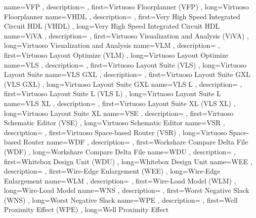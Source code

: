 { name={VFP}
, description={}
, first={Virtuoso Floorplanner (VFP)}
, long={Virtuoso Floorplanner}
}
{ name={VHDL}
, description={}
, first={Very High Speed Integrated Circuit HDL (VHDL)}
, long={Very High Speed Integrated Circuit HDL}
}
{ name={ViVA}
, description={}
, first={Virtuoso Visualization and Analysis (ViVA)}
, long={Virtuoso Visualization and Analysis}
}
{ name={VLM}
, description={}
, first={Virtuoso Layout Optimize (VLM)}
, long={Virtuoso Layout Optimize}
}
{ name={VLS}
, description={}
, first={Virtuoso Layout Suite (VLS)}
, long={Virtuoso Layout Suite}
}
{ name={VLS GXL}
, description={}
, first={Virtuoso Layout Suite GXL (VLS GXL)}
, long={Virtuoso Layout Suite GXL}
}
{ name={VLS L}
, description={}
, first={Virtuoso Layout Suite L (VLS L)}
, long={Virtuoso Layout Suite L}
}
{ name={VLS XL}
, description={}
, first={Virtuoso Layout Suite XL (VLS XL)}
, long={Virtuoso Layout Suite XL}
}
{ name={VSE}
, description={}
, first={Virtuoso Schematic Editor (VSE)}
, long={Virtuoso Schematic Editor}
}
{ name={VSR}
, description={}
, first={Virtuoso Space-based Router (VSR)}
, long={Virtuoso Space-based Router}
}
{ name={WDF}
, description={}
, first={Workshare Compare Delta File (WDF)}
, long={Workshare Compare Delta File}
}
{ name={WDU}
, description={}
, first={Whitebox Design Unit (WDU)}
, long={Whitebox Design Unit}
}
{ name={WEE}
, description={}
, first={Wire-Edge Enlargement (WEE)}
, long={Wire-Edge Enlargement}
}
{ name={WLM}
, description={}
, first={Wire-Load Model (WLM)}
, long={Wire-Load Model}
}
{ name={WNS}
, description={}
, first={Worst Negative Slack (WNS)}
, long={Worst Negative Slack}
}
{ name={WPE}
, description={}
, first={Well Proximity Effect (WPE)}
, long={Well Proximity Effect}
}
